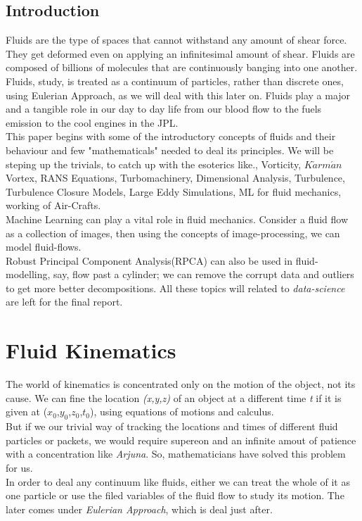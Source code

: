 \documentclass{book}
\begin{document}
\newpage
\tableofcontents
{}
\pagestyle{fancy}
\fancyhf{}
\begin{center}
\chapter{Introduction}
\end{center}
\hspace{0.5cm} Fluids are the type of spaces that cannot withstand any amount of shear force. They get deformed even on applying an infinitesimal amount of shear. Fluids are composed of billions of molecules that are continuously banging into one another. Fluids, study, is treated as a continuum of particles, rather than discrete ones, using Eulerian Approach, as we will deal with this later on. Fluids play a major and a tangible role in our day to day life \textemdash from our blood flow to the fuels emission to the cool engines in the JPL.\\
This paper begins with some of the introductory concepts of fluids and their behaviour and few "mathematicals" needed to deal its principles. We will be steping up the trivials, to catch up with the esoterics like., Vorticity, $K\acute{a}rm\acute{a}n$ Vortex, RANS Equations, Turbomachinery, Dimensional Analysis, Turbulence, Turbulence Closure Models, Large Eddy Simulations, ML for fluid mechanics, working of Air-Crafts.\\
Machine Learning can play a vital role in fluid mechanics. Consider a fluid flow as a collection of images, then using the concepts of image-processing, we can model fluid-flows.\\
Robust Principal Component Analysis(RPCA) can also be used in fluid-modelling, say, flow past a cylinder; we can remove the corrupt data and outliers to get more better decompositions.
All these topics will related to \emph{data-science} are left for the final report.
\newpage

\chapter{Fluid Kinematics}
\hspace{1.3cm}The world of kinematics is concentrated only on the motion of the object, not its cause. We can fine the location \emph{(x,y,z)} of an object at a different time \emph t if it is given at ($x_0$,$y_0$,$z_0$,$t_0$), using equations of motions and calculus.\\ But if we our trivial way of tracking the locations and times of different fluid  particles or packets, we would require supereon and an infinite amout of patience with a concentration like \emph{Arjuna}. So, mathematicians have solved this problem for us.\\
In order to deal any continuum like fluids, either we can treat the whole of it as one particle or use the filed variables of the fluid flow to study its motion. The later comes under \emph{Eulerian Approach}, which is deal just after.
\end{document}
